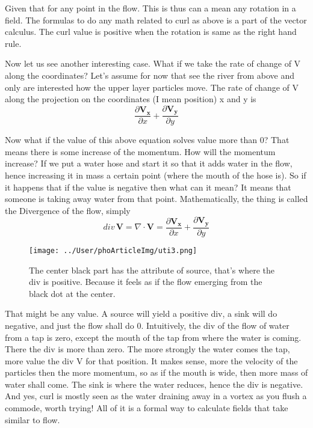 \documentclass[11pt,a4paper,twocolumn,openright]{article}
\renewcommand{\vec}[1]{\boldsymbol{#1}}
\theoremstyle{definition}
\theoremstyle{definition}
\theoremstyle{definition}
\theoremstyle{definition}
\begin{document}
Given that for any point in the flow. This is thus can a mean any rotation in a field. The formulas to do any math related to curl as above is a part of the vector calculus. The curl value is positive when the rotation is same as the right hand rule. 


Now let us see another interesting case. What if we take the rate of change of V along the coordinates? Let's assume for now that see the river from above and only are interested how the upper layer particles move. The rate of change of V along the projection on the coordinates (I mean position) x and y is 
	\begin{equation}
	 \frac{\partial \vec{V_x}}{\partial x} +
	  \frac{\partial \vec{V_y}}{\partial y}
	\end{equation}


Now what if the value of this above equation solves value more than 0? That means there is some increase of the momentum. How will the momentum increase? If we put a water hose and start it so that it adds water in the flow, hence increasing it in mass a certain point (where the mouth of the hose is). So if it happens that if the value is negative then what can it mean? It means that someone is taking away water from that point. Mathematically, the thing is called the Divergence of the flow, simply
	\begin{equation}
	div \, \vec{V} = \nabla \cdot \vec{V} = 	
	 \frac{\partial \vec{V_x}}{\partial x} +
	  \frac{\partial \vec{V_y}}{\partial y}
	\end{equation}

\begin{figure}[hbtp]
\centering
\texttt{[image: ../User/phoArticleImg/uti3.png]}
\caption{The center black part has the attribute of source, that's where the div is positive. Because it feels as if the flow emerging from the black dot at the center.}
\end{figure}

That might be any value. A source will yield a positive div, a sink will do negative, and just the flow shall do 0. Intuitively, the div of the flow of water from a tap is zero, except the mouth of the tap from where the water is coming. There the div is more than zero. The more strongly the water comes the tap, more value the div V for that position. It makes sense, more the velocity of the particles then the more momentum, so as if the mouth is wide, then more mass of water shall come. The sink is where the water reduces, hence the div is negative. And yes, curl is mostly seen as the water draining away in a vortex as you flush a commode, worth trying! 
All of it is a formal way to calculate fields that take similar to flow.
\end{document}
